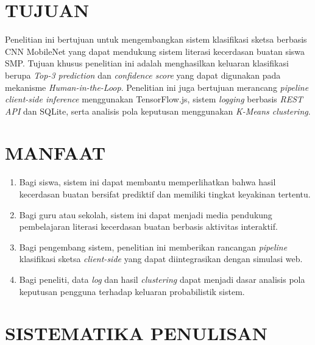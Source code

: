 \documentclass[12pt,a4paper,oneside,openany]{report}
\begin{document}
\section{TUJUAN}
\label{sec:tujuan}

Penelitian ini bertujuan untuk mengembangkan sistem klasifikasi sketsa berbasis CNN MobileNet yang dapat mendukung sistem literasi kecerdasan buatan siswa SMP. Tujuan khusus penelitian ini adalah menghasilkan keluaran klasifikasi berupa \textit{Top-3 prediction} dan \textit{confidence score} yang dapat digunakan pada mekanisme \textit{Human-in-the-Loop}. Penelitian ini juga bertujuan merancang \textit{pipeline client-side inference} menggunakan TensorFlow.js, sistem \textit{logging} berbasis \textit{REST API} dan SQLite, serta analisis pola keputusan menggunakan \textit{K-Means clustering}.

\section{MANFAAT}
\label{sec:manfaat}

\begin{enumerate}
    \item Bagi siswa, sistem ini dapat membantu memperlihatkan bahwa hasil kecerdasan buatan bersifat prediktif dan memiliki tingkat keyakinan tertentu.
    \item Bagi guru atau sekolah, sistem ini dapat menjadi media pendukung pembelajaran literasi kecerdasan buatan berbasis aktivitas interaktif.
    \item Bagi pengembang sistem, penelitian ini memberikan rancangan \textit{pipeline} klasifikasi sketsa \textit{client-side} yang dapat diintegrasikan dengan simulasi web.
    \item Bagi peneliti, data \textit{log} dan hasil \textit{clustering} dapat menjadi dasar analisis pola keputusan pengguna terhadap keluaran probabilistik sistem.
\end{enumerate}

\section{SISTEMATIKA PENULISAN}
\label{sec:sistematika-penulisan}
\end{document}
